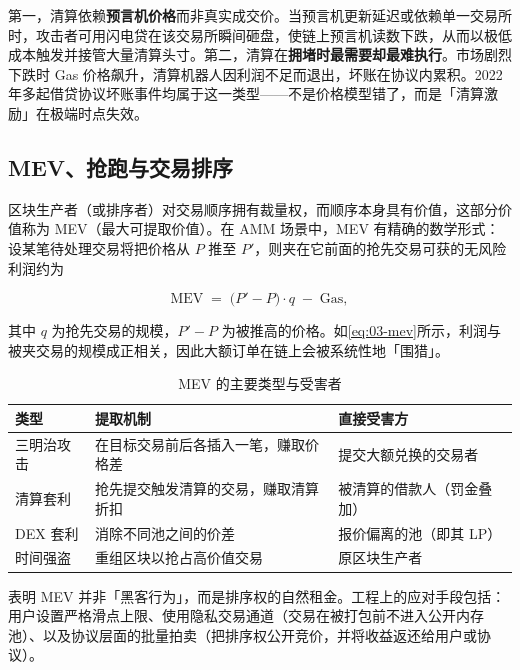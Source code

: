 \begin{warningbox}
第一，清算依赖\textbf{预言机价格}而非真实成交价。当预言机更新延迟或依赖单一交易所时，攻击者可用闪电贷在该交易所瞬间砸盘，使链上预言机读数下跌，从而以极低成本触发并接管大量清算头寸。第二，清算在\textbf{拥堵时最需要却最难执行}。市场剧烈下跌时 Gas 价格飙升，清算机器人因利润不足而退出，坏账在协议内累积。2022 年多起借贷协议坏账事件均属于这一类型——不是价格模型错了，而是「清算激励」在极端时点失效。
\end{warningbox}

\subsection{MEV、抢跑与交易排序}

区块生产者（或排序者）对交易顺序拥有裁量权，而顺序本身具有价值，这部分价值称为 MEV（最大可提取价值）。在 AMM 场景中，MEV 有精确的数学形式：设某笔待处理交易将把价格从 $P$ 推至 $P'$，则夹在它前面的抢先交易可获的无风险利润约为

\begin{equation}
  \text{MEV} \;=\; \bigl(P' - P\bigr)\cdot q \;-\; \text{Gas},
  \label{eq:03-mev}
\end{equation}

其中 $q$ 为抢先交易的规模，$P'-P$ 为被推高的价格。如\cref{eq:03-mev}所示，利润与被夹交易的规模成正相关，因此大额订单在链上会被系统性地「围猎」。

\begin{table}[htbp]
\centering
\caption{MEV 的主要类型与受害者}\label{tab:03-mev}
\tablefont
\begin{tabular}{@{}lL{4.0cm}L{5.8cm}@{}}
\toprule
类型 & 提取机制 & 直接受害方 \\
\midrule
三明治攻击 & 在目标交易前后各插入一笔，赚取价格差 & 提交大额兑换的交易者 \\
清算套利 & 抢先提交触发清算的交易，赚取清算折扣 & 被清算的借款人（罚金叠加） \\
DEX 套利 & 消除不同池之间的价差 & 报价偏离的池（即其 LP） \\
时间强盗 & 重组区块以抢占高价值交易 & 原区块生产者 \\
\bottomrule
\end{tabular}
\end{table}

表明 MEV 并非「黑客行为」，而是排序权的自然租金。工程上的应对手段包括：用户设置严格滑点上限、使用隐私交易通道（交易在被打包前不进入公开内存池）、以及协议层面的批量拍卖（把排序权公开竞价，并将收益返还给用户或协议）。

